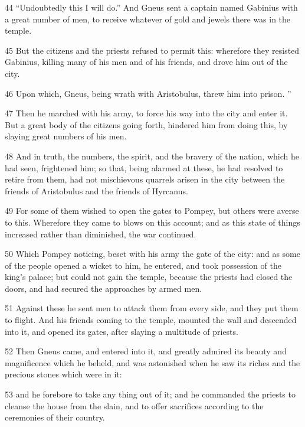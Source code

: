\par 44 “Undoubtedly this I will do.” And Gneus sent a captain named Gabinius with a great number of men, to receive whatever of gold and jewels there was in the temple. 

\par 45 But the citizens and the priests refused to permit this: wherefore they resisted Gabinius, killing many of his men and of his friends, and drove him out of the city. 

\par 46 Upon which, Gneus, being wrath with Aristobulus, threw him into prison. ”

\par 47 Then he marched with his army, to force his way into the city and enter it. But a great body of the citizens going forth, hindered him from doing this, by slaying great numbers of his men. 

\par 48 And in truth, the numbers, the spirit, and the bravery of the nation, which he had seen, frightened him; so that, being alarmed at these, he had resolved to retire from them, had not mischievous quarrels arisen in the city between the friends of Aristobulus and the friends of Hyrcanus. 

\par 49 For some of them wished to open the gates to Pompey, but others were averse to this. Wherefore they came to blows on this account; and as this state of things increased rather than diminished, the war continued. 

\par 50 Which Pompey noticing, beset with his army the gate of the city: and as some of the people opened a wicket to him, he entered, and took possession of the king’s palace; but could not gain the temple, because the priests had closed the doors, and had secured the approaches by armed men. 

\par 51 Against these he sent men to attack them from every side, and they put them to flight. And his friends coming to the temple, mounted the wall and descended into it, and opened its gates, after slaying a multitude of priests. 

\par 52 Then Gneus came, and entered into it, and greatly admired its beauty and magnificence which he beheld, and was astonished when he saw its riches and the precious stones which were in it: 

\par 53 and he forebore to take any thing out of it; and he commanded the priests to cleanse the house from the slain, and to offer sacrifices according to the ceremonies of their country. 

